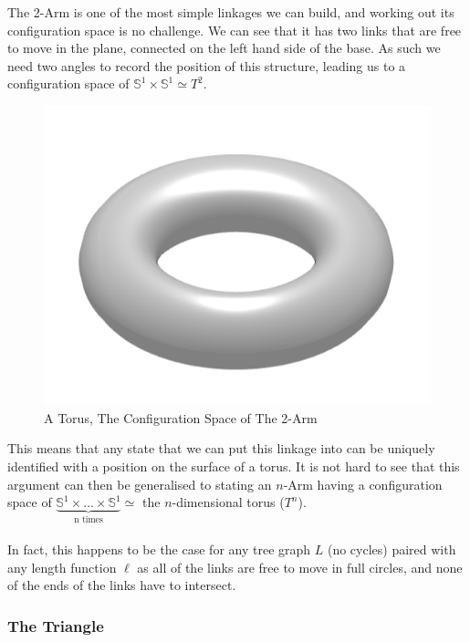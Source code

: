 \documentclass{article}
\begin{document}
\noindent The 2-Arm is one of the most simple linkages we can build, and working out its configuration space is no challenge. We can see that it has two links that are free to move in the plane, connected on the left hand side of the base. As such we need two angles to record the position of this structure, leading us to a configuration space of $\mathbb S^1 \times \mathbb S^1 \simeq T^2$.

\begin{figure}[h!]
\centering
\includegraphics[scale=0.5]{./images/torus}
\caption{A Torus, The Configuration Space of The 2-Arm}
\label{fig:A Torus, The Configuration Space of The 2-Arm}
\end{figure}

\noindent This means that any state that we can put this linkage into can be uniquely identified with a position on the surface of a torus. It is not hard to see that this argument can then be generalised to stating an $n$-Arm having a configuration space of $\underbrace{ \mathbb S^1 \times \dots \times \mathbb S^1}_\text{n times} \simeq$ the $n$-dimensional torus ($T^n$). \\\\ In fact, this happens to be the case for any tree graph $L$ (no cycles) paired with any length function $\ell$ as all of the links are free to move in full circles, and none of the ends of the links have to intersect.


\subsubsection{The Triangle}
\end{document}
